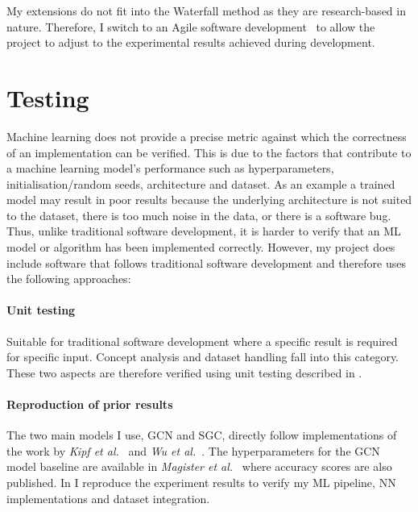 My extensions do not fit into the Waterfall method as they are research-based in nature. Therefore, I switch to an Agile software development~\cite{beck2001manifesto} to allow the project to adjust to the experimental results achieved during development.

\section{Testing}
\label{sec:testing}


Machine learning does not provide a precise metric against which the correctness of an implementation can be verified.
This is due to the factors that contribute to a machine learning model's performance such as hyperparameters, initialisation/random seeds, architecture and dataset.
As an example a trained model may result in poor results because the underlying architecture is not suited to the dataset, there is too much noise in the data, or there is a software bug.
Thus, unlike traditional software development, it is harder to verify that an ML model or algorithm has been implemented correctly.
However, my project does include software that follows traditional software development and therefore uses the following approaches:

\paragraph{Unit testing}
Suitable for traditional software development where a specific result is required for specific input.
Concept analysis and dataset handling fall into this category.
These two aspects are therefore verified using unit testing described in .

\paragraph{Reproduction of prior results}
The two main models I use, GCN and SGC, directly follow implementations of the work by \textit{Kipf et al.}~\cite{kipf2016semi} and \textit{Wu et al.}~\cite{wu2019simplifying}.
The hyperparameters for the GCN model baseline are available in \textit{Magister et al.}~\cite{magister2021gcexplainer} where accuracy scores are also published.
In  I reproduce the experiment results to verify my ML pipeline, NN implementations and dataset integration.

